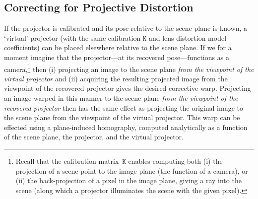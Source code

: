 \documentclass[review]{elsarticle}
\begin{document}
\subsection{Correcting for Projective Distortion}\label{sec:approach:homography}

If the projector is calibrated and its pose relative to the scene plane is known, a `virtual' projector (with the same calibration $\mathtt{K}$ and lens distortion model coefficients) can be placed elsewhere relative to the scene plane. If we for a moment imagine that the projector---at its recovered pose---functions as a camera,\footnote{Recall that the calibration matrix~$\mathtt{K}$ enables computing both (i) the projection of a scene point to the image plane (the function of a camera), or (ii) the back-projection of a pixel in the image plane, giving a ray into the scene (along which a projector illuminates the scene with the given pixel).} then (i) projecting an image to the scene plane \textit{from the viewpoint of the virtual projector} and (ii) acquiring the resulting projected image from the viewpoint of the recovered projector gives the desired corrective warp. Projecting an image warped in this manner to the scene plane \textit{from the viewpoint of the recovered projector} then has the same effect as projecting the original image to the scene plane from the viewpoint of the virtual projector. This warp can be effected using a plane-induced homography, computed analytically as a function of the scene plane, the projector, and the virtual projector.
\end{document}

